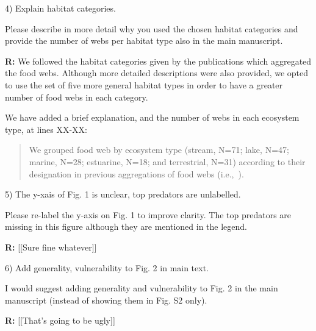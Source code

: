 \documentclass[12pt]{letter}
\newenvironment{refquote}{\bigskip \begin{it}}{\end{it}\smallskip}
\begin{document}
  4) Explain habitat categories.

  \begin{refquote}

    Please describe in more detail why you used the chosen habitat categories
    and provide the number of webs per habitat type also in the main
    manuscript.

  \end{refquote}


  \textbf{R:} We followed the habitat categories given by the publications which
  aggregated the food webs. Although more detailed descriptions were also provided, 
  we opted to use the set of five more general habitat types in order to have a 
  greater number of food webs in each category.


  We have added a brief explanation, and the number of webs in each ecosystem type, at lines XX-XX:

  \begin{quotation}
    We grouped food web by ecosystem type (stream, N=71; lake, N=47; marine, N=28; estuarine, N=18;
    and terrestrial, N=31) according to their designation in previous aggregations of food webs 
    (i.e.,~\citet{GlobalWeb,Riede2011,Dunne2013}).
    
  \end{quotation}


  5) The y-xais of Fig. 1 is unclear, top predators are unlabelled.


  \begin{refquote}

    Please re-label the y-axis on Fig. 1 to improve clarity. The top predators
    are missing in this figure although they are mentioned in the legend.

  \end{refquote}


  \textbf{R:} [[Sure fine whatever]]


  6) Add generality, vulnerability to Fig. 2 in main text.


  \begin{refquote}

    I would suggest adding generality and vulnerability to Fig. 2 in the main
    manuscript (instead of showing them in Fig. S2 only).

  \end{refquote}


  \textbf{R:} [[That's going to be ugly]]


  \newpage



\end{document}
